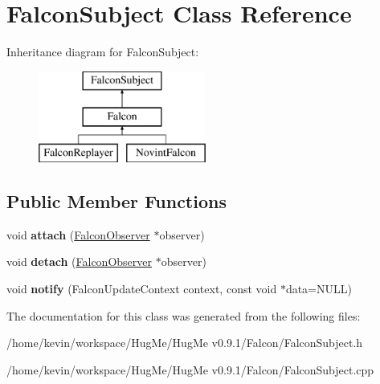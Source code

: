 \hypertarget{classFalconSubject}{
\section{FalconSubject Class Reference}
\label{classFalconSubject}
}
Inheritance diagram for FalconSubject:\begin{figure}[H]
\begin{center}
\leavevmode
\includegraphics[height=3cm]{classFalconSubject}
\end{center}
\end{figure}
\subsection*{Public Member Functions}
\begin{DoxyCompactItemize}
\item 
\hypertarget{classFalconSubject_a081d12a24abd16b88b69230f82ce1ec7}{
void {\bfseries attach} (\hyperlink{classFalconObserver}{FalconObserver} $\ast$observer)}
\label{classFalconSubject_a081d12a24abd16b88b69230f82ce1ec7}

\item 
\hypertarget{classFalconSubject_aaa69f14bf9659f783b9d95da47e55868}{
void {\bfseries detach} (\hyperlink{classFalconObserver}{FalconObserver} $\ast$observer)}
\label{classFalconSubject_aaa69f14bf9659f783b9d95da47e55868}

\item 
\hypertarget{classFalconSubject_abd19e56b3ffb433705576e361cc5b28f}{
void {\bfseries notify} (FalconUpdateContext context, const void $\ast$data=NULL)}
\label{classFalconSubject_abd19e56b3ffb433705576e361cc5b28f}

\end{DoxyCompactItemize}


The documentation for this class was generated from the following files:\begin{DoxyCompactItemize}
\item 
/home/kevin/workspace/HugMe/HugMe v0.9.1/Falcon/FalconSubject.h\item 
/home/kevin/workspace/HugMe/HugMe v0.9.1/Falcon/FalconSubject.cpp\end{DoxyCompactItemize}
